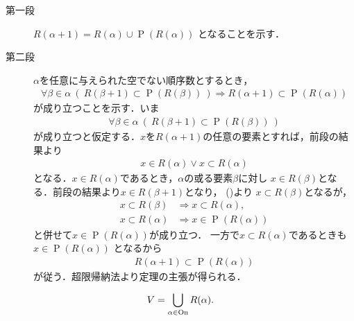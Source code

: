 	\begin{prf}\mbox{}
		\begin{description}
			\item[第一段] $R(\alpha + 1) = R(\alpha) \cup \operatorname{P}(R(\alpha))$
				となることを示す．
				
			\item[第二段] $\alpha$を任意に与えられた空でない順序数とするとき，
				\begin{align}
					\forall \beta \in \alpha\ 
					\left(\ R(\beta + 1) \subset \operatorname{P}(R(\beta))\ \right)
					\Longrightarrow R(\alpha + 1) \subset \operatorname{P}(R(\alpha))
				\end{align}
				が成り立つことを示す．いま
				\begin{align}
					\forall \beta \in \alpha\ 
					\left(\ R(\beta + 1) \subset \operatorname{P}(R(\beta))\ \right)
					\label{eq:thm_R_alpha_plus_1_equals_to_power_of_R_alpha}
				\end{align}
				が成り立つと仮定する．$x$を$R(\alpha + 1)$の任意の要素とすれば，前段の結果より
				\begin{align}
					x \in R(\alpha) \vee x \subset R(\alpha)
				\end{align}
				となる．$x \in R(\alpha)$であるとき，$\alpha$の或る要素$\beta$に対し
				$x \in R(\beta)$となる．前段の結果より$x \in R(\beta + 1)$となり，
				()より
				$x \subset R(\beta)$となるが，
				\begin{align}
					x \subset R(\beta) &\Longrightarrow x \subset R(\alpha), \\
					x \subset R(\alpha) &\Longrightarrow x \in \operatorname{P}(R(\alpha))
				\end{align}
				と併せて$x \in \operatorname{P}(R(\alpha))$が成り立つ．
				一方で$x \subset R(\alpha)$であるときも$x \in \operatorname{P}(R(\alpha))$
				となるから
				\begin{align}
					R(\alpha + 1) \subset \operatorname{P}(R(\alpha))
				\end{align}
				が従う．超限帰納法より定理の主張が得られる．
		\end{description}
	\end{prf}
	
	\begin{screen}
		\begin{thm}
			\begin{align}
				V = \bigcup_{\alpha \in \mathrm{On}} R(\alpha).
			\end{align}
		\end{thm}
	\end{screen}
	
